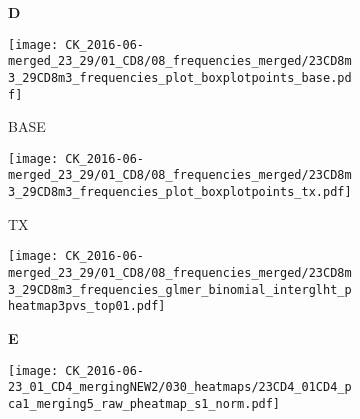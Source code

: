 \documentclass[a4paper, 12pt]{article}
\begin{document}
\begin{figure}[!thb]
\centering

    \caption{Frequencies CD8}
    \begin{subfigure}[t]{0.02\textwidth}
    \vskip 0pt
        \textbf{\textsf{\normalsize D}}
    \end{subfigure}
    \begin{subfigure}[t]{0.45\textwidth}
    \vskip 0pt
    \caption{BASE}
        \texttt{[image: CK\_2016-06-merged\_23\_29/01\_CD8/08\_frequencies\_merged/23CD8m3\_29CD8m3\_frequencies\_plot\_boxplotpoints\_base.pdf]}
    \end{subfigure}
    \quad
        \begin{subfigure}[t]{0.02\textwidth}
    \vskip 0pt
        \textbf{\textsf{\normalsize }}
    \end{subfigure}
    \begin{subfigure}[t]{0.45\textwidth}
    \vskip 0pt
    \caption{TX}
        \texttt{[image: CK\_2016-06-merged\_23\_29/01\_CD8/08\_frequencies\_merged/23CD8m3\_29CD8m3\_frequencies\_plot\_boxplotpoints\_tx.pdf]}
    \end{subfigure}

    \begin{subfigure}[t]{0.02\textwidth}
    \vskip 0pt
        \textbf{\textsf{\normalsize }}
    \end{subfigure}
    \begin{subfigure}[t]{0.5\textwidth}
    \vskip 0pt
    \caption{}
        \texttt{[image: CK\_2016-06-merged\_23\_29/01\_CD8/08\_frequencies\_merged/23CD8m3\_29CD8m3\_frequencies\_glmer\_binomial\_interglht\_pheatmap3pvs\_top01.pdf]}
    \end{subfigure}


\end{figure}


\begin{figure}[!thb]
\centering

    \caption{Heatmap - data 23 CD4}
    \begin{subfigure}[t]{0.02\textwidth}
    \vskip 0pt
        \textbf{\textsf{\normalsize E}}
    \end{subfigure}
    \begin{subfigure}[t]{0.97\textwidth}
    \vskip 0pt
    \caption{}
        \texttt{[image: CK\_2016-06-23\_01\_CD4\_mergingNEW2/030\_heatmaps/23CD4\_01CD4\_pca1\_merging5\_raw\_pheatmap\_s1\_norm.pdf]}
    \end{subfigure}
    
\end{figure}
\end{document}
